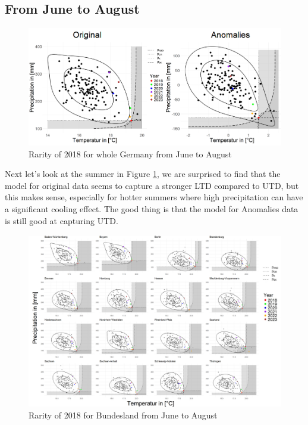 \documentclass[
]{krantz}
\begin{document}
\subsection{From June to August}\label{from-june-to-august}

\begin{figure}

{\centering \includegraphics[width=0.8\linewidth]{work/03-compounds/figures/RESULTS/resultallJJA} 

}

\caption{Rarity of 2018 for whole Germany from June to August}\label{fig:result4-shiyu}
\end{figure}

Next let's look at the summer in Figure \ref{fig:result4-shiyu}, we are surprised to find that the model for original data seems to capture a stronger LTD compared to UTD, but this makes sense, especially for hotter summers where high precipitation can have a significant cooling effect. The good thing is that the model for Anomalies data is still good at capturing UTD.

\begin{figure}

{\centering \includegraphics[width=0.8\linewidth]{work/03-compounds/figures/RESULTS/resultJJA} 

}

\caption{Rarity of 2018 for Bundesland from June to August}\label{fig:result5-shiyu}
\end{figure}
\end{document}
